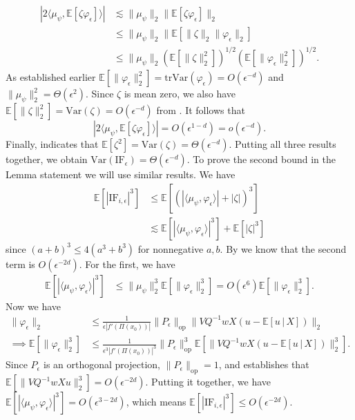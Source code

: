 \documentclass[11pt]{article}
\begin{document}
\begin{align*}
    |2\langle \mu_{\psi}, \mathbb{E}[\zeta \varphi_{ \epsilon}]\rangle| & \lesssim \|\mu_\psi\|_2\|\mathbb{E}[\zeta \varphi_{\epsilon}]\|_2 \tag{Cauchy-Schwartz} \\
    &\leq\|\mu_\psi\|_2\|\mathbb{E}[\|\zeta\|_2 \|\varphi_{\epsilon}\|_2] \tag{Jensen's Inequality}\\
    &\leq \|
    \mu_{\psi}\|_2 \left(\mathbb{E}[\|\zeta\|_2^2]\right)^{1/2}\left(\mathbb{E}[\|\varphi_{\epsilon}\|_2^2]\right)^{1/2}. \tag{Cauchy-Schwartz}
\end{align*}
As established earlier $\mathbb{E}[\|\varphi_{\epsilon}\|_2^2] = \text{tr}\text{Var}(\varphi_\epsilon) = O(\epsilon^{-d})$ and $\|\mu_\psi\|_2^2 = \Theta(\epsilon^2)$. Since $\zeta$ is mean zero, we also have $\mathbb{E}[\|\zeta\|_2^2] = \text{Var}(\zeta) = O(\epsilon^{-d})$ from . It follows that 
\[|2\langle \mu_{\psi}, \mathbb{E}[\zeta \varphi_{ \epsilon}]\rangle| = O(\epsilon^{1-d}) = o(\epsilon^{-d}).\]
Finally,  indicates that $\mathbb{E}[\zeta^2] = \text{Var}(\zeta) = \Theta(\epsilon^{-d}).$ Putting all three results together, we obtain $\text{Var}(\text{IF}_{\epsilon}) = \Theta(\epsilon^{-d}).$ To prove the second bound in the Lemma statement we will use similar results. We have
\begin{align*}
    \mathbb{E}[|\text{IF}_{i, \epsilon}|^3] &\leq  \mathbb{E}\left[(|\langle \mu_{\psi}, \varphi_{\epsilon}\rangle|+ |\zeta|)^3\right] \\
    &\lesssim \mathbb{E}\left[|\langle \mu_{\psi}, \varphi_{\epsilon}\rangle|^3 \right]+ \mathbb{E}\left[|\zeta|^3\right]
\end{align*}
since $(a + b)^3 \leq 4(a^3 + b^3)$ for nonnegative $a, b$. By  we know that the second term is $O(\epsilon^{-2d})$. For the first, we have 
\begin{align*}
    \mathbb{E}\left[|\langle \mu_{\psi}, \varphi_{\epsilon}\rangle|^3 \right] &\leq \|\mu_{\psi}\|_2^3\mathbb{E}[\|\varphi_{\epsilon}\|_2^3] = O(\epsilon^6)\mathbb{E}[\|\varphi_{\epsilon}\|_2^3].
\end{align*}
Now we have
\begin{align*}
    \|\varphi_{\epsilon}\|_2 &\leq \frac{1}{\epsilon|f'(\Pi(x_0))|}\|P_{\epsilon}\|_{\text{op}} \|VQ^{-1}wX(u - \mathbb{E}[u \,|\, X])\|_2  \\
    \implies \mathbb{E}[\|\varphi_{\epsilon}\|_2^3] &\leq \frac{1}{\epsilon^3|f'(\Pi(x_0))|^3}\|P_{\epsilon}\|_{\text{op}}^3 \mathbb{E}[\|VQ^{-1}wX(u - \mathbb{E}[u \,|\, X])\|_2^3].
\end{align*}
Since $P_{\epsilon}$ is an orthogonal projection, $\|P_{\epsilon}\|_{\text{op}} = 1$, and  establishes that $\mathbb{E}[\|VQ^{-1}wXu\|_2^3] = O(\epsilon^{-2d})$.  Putting it together, we have $\mathbb{E}\left[|\langle \mu_{\psi}, \varphi_{\epsilon}\rangle|^3 \right] = O(\epsilon^{3-2d})$, which means $\mathbb{E}[|\text{IF}_{i, \epsilon}|^3] \leq O(\epsilon^{-2d})$. 
\end{document}
